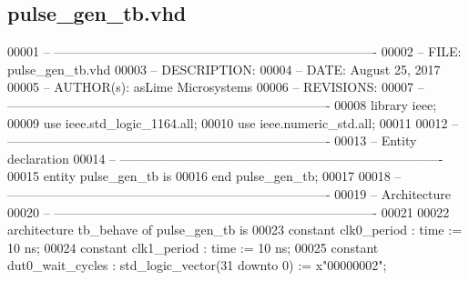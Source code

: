 \subsection{pulse\+\_\+gen\+\_\+tb.\+vhd}
\label{pulse__gen__tb_8vhd_source}

\begin{DoxyCode}
00001 \textcolor{keyword}{-- ---------------------------------------------------------------------------- }
00002 \textcolor{keyword}{-- FILE: pulse\_gen\_tb.vhd}
00003 \textcolor{keyword}{-- DESCRIPTION: }
00004 \textcolor{keyword}{-- DATE: August 25, 2017}
00005 \textcolor{keyword}{-- AUTHOR(s): asLime Microsystems}
00006 \textcolor{keyword}{-- REVISIONS:}
00007 \textcolor{keyword}{-- ---------------------------------------------------------------------------- }
00008 \textcolor{vhdlkeyword}{library }\textcolor{keywordflow}{ieee};
00009 \textcolor{vhdlkeyword}{use }ieee.std\_logic\_1164.\textcolor{keywordflow}{all};
00010 \textcolor{vhdlkeyword}{use }ieee.numeric\_std.\textcolor{keywordflow}{all};
00011 
00012 \textcolor{keyword}{-- ----------------------------------------------------------------------------}
00013 \textcolor{keyword}{-- Entity declaration}
00014 \textcolor{keyword}{-- ----------------------------------------------------------------------------}
00015 \textcolor{keywordflow}{entity }pulse_gen_tb \textcolor{keywordflow}{is}
00016 \textcolor{keywordflow}{end} \textcolor{vhdlchar}{pulse\_gen\_tb};
00017 
00018 \textcolor{keyword}{-- ----------------------------------------------------------------------------}
00019 \textcolor{keyword}{-- Architecture}
00020 \textcolor{keyword}{-- ----------------------------------------------------------------------------}
00021 
00022 \textcolor{keywordflow}{architecture} tb\_behave \textcolor{keywordflow}{of} pulse_gen_tb is
00023    \textcolor{keywordflow}{constant} \textcolor{vhdlchar}{clk0_period}       \textcolor{vhdlchar}{:} \textcolor{comment}{time} \textcolor{vhdlchar}{:=} \textcolor{vhdllogic}{}\textcolor{vhdllogic}{10} \textcolor{vhdlchar}{ns};
00024    \textcolor{keywordflow}{constant} \textcolor{vhdlchar}{clk1_period}       \textcolor{vhdlchar}{:} \textcolor{comment}{time} \textcolor{vhdlchar}{:=} \textcolor{vhdllogic}{}\textcolor{vhdllogic}{10} \textcolor{vhdlchar}{ns};
00025    \textcolor{keywordflow}{constant} \textcolor{vhdlchar}{dut0_wait_cycles}  \textcolor{vhdlchar}{:} \textcolor{comment}{std\_logic\_vector}\textcolor{vhdlchar}{(}\textcolor{vhdllogic}{}\textcolor{vhdllogic}{31} \textcolor{keywordflow}{downto} \textcolor{vhdllogic}{}\textcolor{vhdllogic}{0}\textcolor{vhdlchar}{)} \textcolor{vhdlchar}{:=} \textcolor{vhdlchar}{x}\textcolor{vhdllogic}{"00000002"};

\end{DoxyCode}
